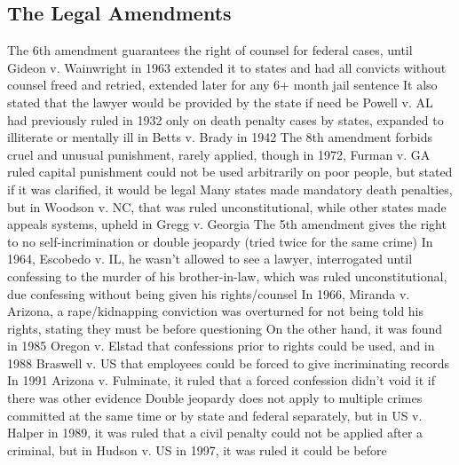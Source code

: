 \documentclass[11 pt, twoside]{article}
\newenvironment{outline*}
{
	\begin{outline}[enumerate]
	}
	{\end{outline}
}
\begin{document}
\subsection{The Legal Amendments}
\begin{outline*}
\1 The 6th amendment guarantees the right of counsel for federal cases, until Gideon v. Wainwright in 1963 extended it to states and had all convicts without counsel freed and retried, extended later for any 6+ month jail sentence
\2 It also stated that the lawyer would be provided by the state if need be
\2 Powell v. AL had previously ruled in 1932 only on death penalty cases by states, expanded to illiterate or mentally ill in Betts v. Brady in 1942
\1 The 8th amendment forbids cruel and unusual punishment, rarely applied, though in 1972, Furman v. GA ruled capital punishment could not be used arbitrarily on poor people, but stated if it was clarified, it would be legal
\2 Many states made mandatory death penalties, but in Woodson v. NC, that was ruled unconstitutional, while other states made appeals systems, upheld in Gregg v. Georgia
\1 The 5th amendment gives the right to no self-incrimination or double jeopardy (tried twice for the same crime)
\2 In 1964, Escobedo v. IL, he wasn’t allowed to see a lawyer, interrogated until confessing to the murder of his brother-in-law, which was ruled unconstitutional, due confessing without being given his rights/counsel
\2 In 1966, Miranda v. Arizona, a rape/kidnapping conviction was overturned for not being told his rights, stating they must be before questioning
\3 On the other hand, it was found in 1985 Oregon v. Elstad that confessions prior to rights could be used, and in 1988 Braswell v. US that employees could be forced to give incriminating records
\3 In 1991 Arizona v. Fulminate, it ruled that a forced confession didn’t void it if there was other evidence 
\2 Double jeopardy does not apply to multiple crimes committed at the same time or by state and federal separately, but in US v. Halper in 1989, it was ruled that a civil penalty could not be applied after a criminal, but in Hudson v. US in 1997, it was ruled it could be before
\end{outline*}
\end{document}
